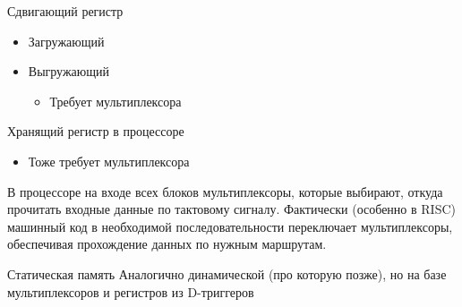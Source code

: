 \documentclass[xetex,aspectratio=43]{beamer}
\begin{document}
\begin{frame}{Сдвигающий регистр}
    \begin{itemize}
        \item
        Загружающий
        \item
        Выгружающий

        \begin{itemize}
            \item
            Требует мультиплексора
        \end{itemize}
    \end{itemize}
\end{frame}

\begin{frame}{Хранящий регистр в процессоре}
        \begin{itemize}
            \item
            Тоже требует мультиплексора
        \end{itemize}

        \pause

        В процессоре на входе всех блоков мультиплексоры, которые выбирают,
        откуда прочитать входные данные по тактовому сигналу. Фактически
        (особенно в RISC) машинный код в необходимой последовательности
        переключает мультиплексоры, обеспечивая прохождение данных по нужным
        маршрутам.
\end{frame}

\begin{frame}{Статическая память}
    Аналогично динамической (про которую позже), но на базе мультиплексоров и регистров из D-триггеров
\end{frame}
\end{document}
